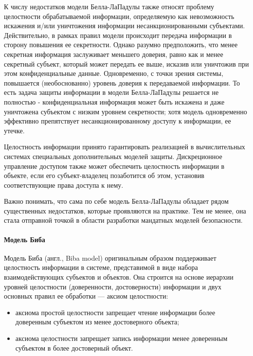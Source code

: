 К числу недостатков модели Белла-ЛаПадулы также относят проблему целостности обрабатываемой информации, определяемую как невозможность искажения и/или уничтожения информации несанкционированными субъектами. Действительно, в рамках правил модели происходит передача информации в сторону повышения ее секретности. Однако разумно предположить, что менее секретная информация заслуживает меньшего доверия, равно как и менее секретный субъект, который может передать ее выше, исказив или уничтожив при этом конфиденциальные данные. Одновременно, с точки зрения системы, повышается (необоснованно) уровень доверия к передаваемой информации. То есть задача защиты информации в модели Белла-ЛаПадулы решается не полностью - конфиденциальная информация может быть искажена и даже уничтожена субъектом с низким уровнем секретности; хотя модель одновременно эффективно препятствует несанкционированному доступу к информации, ее утечке.

Целостность информации принято гарантировать реализацией в вычислительных системах специальных дополнительных моделей защиты. Дискреционное управление доступом также может обеспечить целостность информации в объекте, если его субъект-владелец позаботится об этом, установив соответствующие права доступа к нему.

Важно понимать, что сама по себе модель Белла-ЛаПадулы обладает рядом существенных недостатков, которые проявляются на практике. Тем не менее, она стала отправной точкой в области разработки мандатных моделей безопасности.

\paragraph{Модель Биба}

Модель Биба (англ., Biba model) оригинальным образом поддерживает целостность информации в системе, представимой в виде набора взаимодействующих субъектов и объектов. Она строится на основе иерархии уровней целостности (доверенности, достоверности) информации и двух основных правил ее обработки --- аксиом целостности:

\begin{itemize}
	\item аксиома простой целостности запрещает чтение информации более доверенным субъектом из менее достоверного объекта;
	\item аксиома целостности запрещает запись информации менее доверенным субъектом в более достоверный объект.
\end{itemize}

